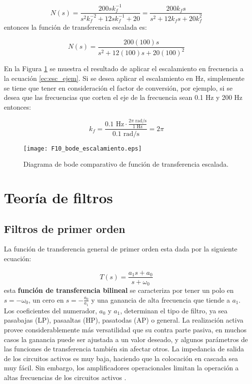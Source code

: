 	\begin{equation}
	N(s) = \frac{200sk_{f}^{-1}}{s^{2}k^{-2}_{f} + 12sk^{-1}_{f} + 20} = \frac{200k_{f}s}{s^{2} + 12 k_{f} s + 20 k^{2}_{f}}
	\end{equation}
	entonces la función de transferencia escalada es:

	\begin{equation}
		N(s)  = \frac{200(100)s}{s^{2} + 12(100)s + 20(100)^{2}}
	\end{equation}
	
	En la Figura \ref{fig:F10_bode_escalamiento} se muestra el resultado de aplicar el escalamiento en frecuencia a la ecuación \ref{ec:esc_ejem}. Si se desea aplicar el escalamiento en Hz, simplemente se tiene que tener en consideración el factor de conversión, por ejemplo, si se desea que las frecuencias que corten el eje de la frecuencia sean 0.1 Hz y 200 Hz entonces:
	
	\begin{equation}
	k_{f} = \frac{0.1 \,\,\mathrm{Hz} \cdot \frac{2 \pi \,\,\mathrm{rad/s}}{1 \,\,\mathrm{Hz}}}{0.1 \,\,\mathrm{rad/s}} = 2 \pi
	\end{equation}
	
	\begin{figure}[hbtp]
	\caption{Diagrama de bode comparativo de función de transferencia escalada.} 
	\label{fig:F10_bode_escalamiento}
	\centering
	\texttt{[image: F10\_bode\_escalamiento.eps]}
	\end{figure}
	
	\section{Teoría de filtros}
	
	\subsection{Filtros de primer orden}
	
	La función de transferencia general de primer orden esta dada por la siguiente ecuación:
	
	\begin{equation}
	T(s) = \frac{a_{1} s + a_{0} }{s + \omega_{0}}
	\label{ec:bilineal_general}
	\end{equation}
	esta \textbf{función de transferencia bilineal} se caracteriza por tener un polo en $s = - \omega_{0}$, un cero en $s = -\frac{a_{0}}{a_{1}}$ y una ganancia de alta frecuencia que tiende a $a_{1}$. Los coeficientes del numerador, $a_{0}$ y $a_{1}$, determinan el tipo de filtro, ya sea pasabajas (LP), pasaaltas (HP), pasatodas (AP) o general. La realización activa provee considerablemente más versatilidad que su contra parte pasiva, en muchos casos la ganancia puede ser ajustada a un valor deseado, y algunos parámetros de las funciones de transferencia también sin afectar otros. La impedancia de salida de los circuitos activos es muy baja, haciendo que la colocación en cascada sea muy fácil. Sin embargo, los amplificadores operacionales limitan la operación a altas frecuencias de los circuitos activos \cite{Sedra2015}.
	
